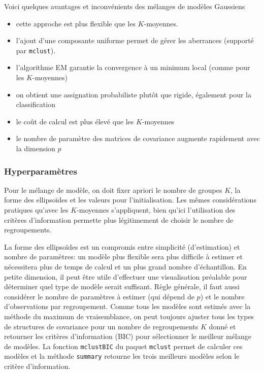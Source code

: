 \documentclass[
  11pt,
  letterpaper,
]{scrbook}
\providecommand{\tightlist}{%
  \setlength{\itemsep}{0pt}\setlength{\parskip}{0pt}}\usepackage{longtable,booktabs,array}
\theoremstyle{definition}
\theoremstyle{remark}
\begin{document}
Voici quelques avantages et inconvénients des mélanges de modèles
Gaussiens

\begin{itemize}
\tightlist
\item
  cette approche est plus flexible que les \(K\)-moyennes.
\item
  l'ajout d'une composante uniforme permet de gérer les aberrances
  (supporté par \texttt{mclust}).
\item
  l'algorithme EM garantie la convergence à un minimum local (comme pour
  les \(K\)-moyennes)
\item
  on obtient une assignation probabiliste plutôt que rigide, également
  pour la classification
\item
  le coût de calcul est plus élevé que les \(K\)-moyennes
\item
  le nombre de paramètre des matrices de covariance augmente rapidement
  avec la dimension \(p\)
\end{itemize}

\hypertarget{hyperparamuxe8tres}{%
\subsubsection{Hyperparamètres}\label{hyperparamuxe8tres}}

Pour le mélange de modèle, on doit fixer apriori le nombre de groupes
\(K\), la forme des ellipsoïdes et les valeurs pour l'initialisation.
Les mêmes considérations pratiques qu'avec les \(K\)-moyennes
s'appliquent, bien qu'ici l'utilisation des critères d'information
permette plus légitimement de choisir le nombre de regroupements.

La forme des ellipsoïdes est un compromis entre simplicité
(d'estimation) et nombre de paramètres: un modèle plus flexible sera
plus difficile à estimer et nécessitera plus de temps de calcul et un
plus grand nombre d'échantillon. En petite dimension, il peut être utile
d'effectuer une visualisation préalable pour déterminer quel type de
modèle serait suffisant. Règle générale, il faut aussi considérer le
nombre de paramètres à estimer (qui dépend de \(p\)) et le nombre
d'observations par regroupement. Comme tous les modèles sont estimés
avec la méthode du maximum de vraisemblance, on peut toujours ajuster
tous les types de structures de covariance pour un nombre de
regroupements \(K\) donné et retourner les critères d'information (BIC)
pour sélectionner le meilleur mélange de modèles. La fonction
\texttt{mclustBIC} du paquet \texttt{mclust} permet de calculer ces
modèles et la méthode \texttt{summary} retourne les trois meilleurs
modèles selon le critère d'information.
\end{document}
